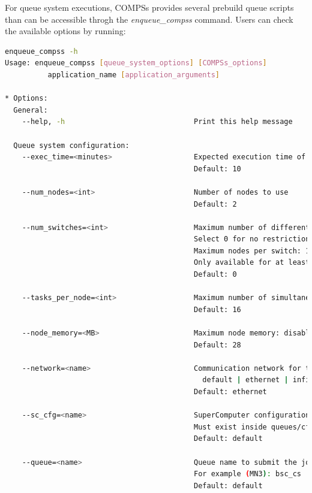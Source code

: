 For queue system executions, COMPSs provides several prebuild queue scripts than can be accessible throgh the \textit{enqueue\_compss}
command. Users can check the available options by running:
\begin{lstlisting}[language=bash]
enqueue_compss -h
Usage: enqueue_compss [queue_system_options] [COMPSs_options] 
          application_name [application_arguments]

* Options:
  General:
    --help, -h                              Print this help message
  
  Queue system configuration:
    --exec_time=<minutes>                   Expected execution time of the application (in minutes)
                                            Default: 10
                                            
    --num_nodes=<int>                       Number of nodes to use
                                            Default: 2
                                            
    --num_switches=<int>                    Maximum number of different switches. 
                                            Select 0 for no restrictions.
                                            Maximum nodes per switch: 18
                                            Only available for at least 4 nodes. 
                                            Default: 0 

    --tasks_per_node=<int>                  Maximum number of simultaneous tasks running on a node
                                            Default: 16
                                            
    --node_memory=<MB>                      Maximum node memory: disabled | <int> (MB)
                                            Default: 28
                                            
    --network=<name>                        Communication network for transfers: 
                                              default | ethernet | infiniband | data.
                                            Default: ethernet

    --sc_cfg=<name>                         SuperComputer configuration file to use. 
                                            Must exist inside queues/cfgs/
                                            Default: default
                                            
    --queue=<name>                          Queue name to submit the job. Depends on the queue system.
                                            For example (MN3): bsc_cs | bsc_debug | debug | interactive
                                            Default: default
                                            

\end{lstlisting}
